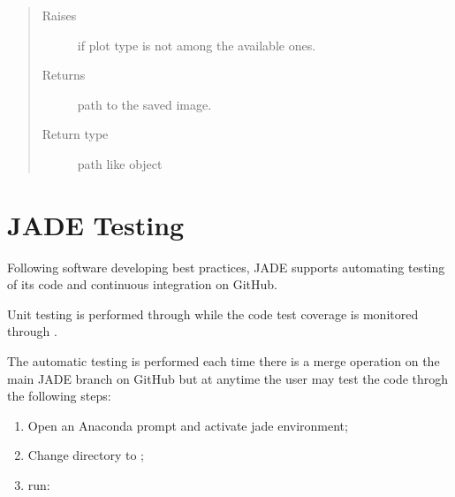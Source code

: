 \documentclass[letterpaper,10pt,english]{sphinxmanual}
\begin{document}
\begin{fulllineitems}
\begin{fulllineitems}
\begin{quote}
\begin{description}
\item[{Raises}] \leavevmode
\sphinxAtStartPar
{} \textendash{} if plot type is not among the available ones.

\item[{Returns}] \leavevmode
\sphinxAtStartPar
{} \textendash{} path to the saved image.

\item[{Return type}] \leavevmode
\sphinxAtStartPar
path like object

\end{description}\end{quote}

\end{fulllineitems}


\end{fulllineitems}



\chapter{JADE Testing}
\label{\detokenize{testing/testing:jade-testing}}\label{\detokenize{testing/testing::doc}}
\sphinxAtStartPar
Following software developing best practices, JADE supports automating testing
of its code and continuous integration on GitHub.

\sphinxAtStartPar
Unit testing is performed through  while the code test coverage is
monitored through .

\sphinxAtStartPar
The automatic testing is performed each time there is a merge operation on the
main JADE branch on GitHub but at anytime the user may test the code throgh the
following steps:
\begin{enumerate}
%
\item {} 
\sphinxAtStartPar
Open an Anaconda prompt and activate jade environment;

\item {} 
\sphinxAtStartPar
Change directory to ;

\item {} 
\sphinxAtStartPar
run:

\sphinxAtStartPar
{}

\end{enumerate}
\end{document}
